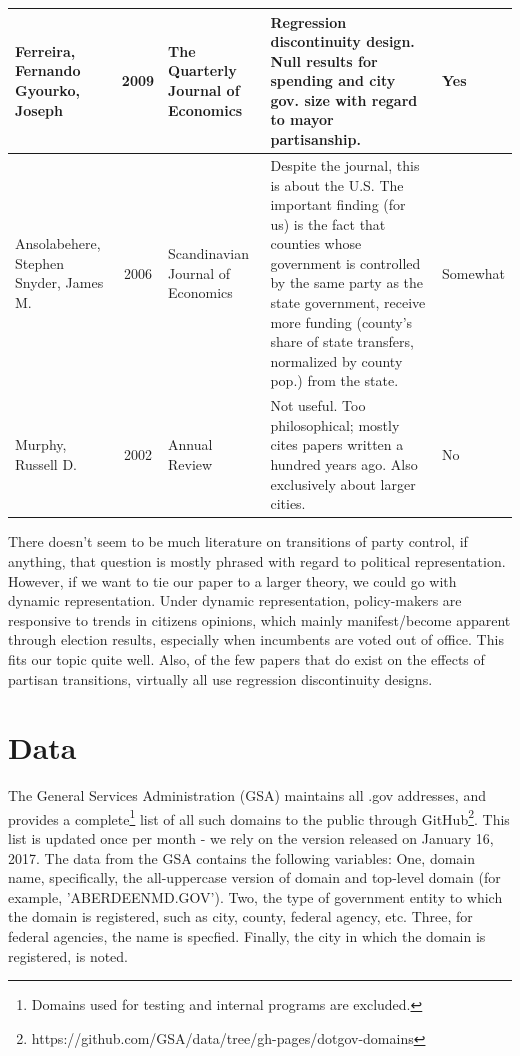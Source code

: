 \documentclass[11pt]{article}
\begin{document}
\begin{landscape}
\begin{table}[htbp]
\begin{tabular}{|p{2cm}|c|p{3cm}|p{12cm}|l|}
			Ferreira, Fernando
			Gyourko, Joseph & 2009 & The Quarterly Journal of Economics & Regression discontinuity design. Null results for spending and city gov. size with regard to mayor partisanship. & Yes \\ \hline
			Ansolabehere, Stephen
			Snyder, James M. & 2006 & Scandinavian Journal of Economics & Despite the journal, this is about the U.S. The important finding (for us) is the fact that counties whose government is controlled by the same party as the state government, receive more funding (county's share of state transfers, normalized by county pop.) from the state. & Somewhat \\ \hline
			Murphy, Russell D. & 2002 & Annual Review & Not useful. Too philosophical; mostly cites papers written a hundred years ago. Also exclusively about larger cities. & No \\ \hline
		\end{tabular}
		\label{}
	\end{table}
\end{landscape}

There doesn't seem to be much literature on transitions of party control, if anything, that question is mostly phrased with regard to political representation. However, if we want to tie our paper to a larger theory, we could go with dynamic representation. Under dynamic representation, policy-makers are responsive to trends in citizens opinions, which mainly manifest/become apparent through election results, especially when incumbents are voted out of office. This fits our topic quite well. Also, of the few papers that do exist on the effects of partisan transitions, virtually all use regression discontinuity designs.

\section{Data}
The General Services Administration (GSA) maintains all .gov addresses, and provides a complete\footnote{Domains used for testing and internal programs are excluded.} list of all such domains to the public through GitHub\footnote{https://github.com/GSA/data/tree/gh-pages/dotgov-domains}. This list is updated once per month - we rely on the version released on January 16, 2017. The data from the GSA contains the following variables: One, domain name, specifically, the all-uppercase version of domain and top-level domain (for example, 'ABERDEENMD.GOV'). Two, the type of government entity to which the domain is registered, such as city, county, federal agency, etc. Three, for federal agencies, the name is specfied. Finally, the city in which the domain is registered, is noted.
\end{document}
